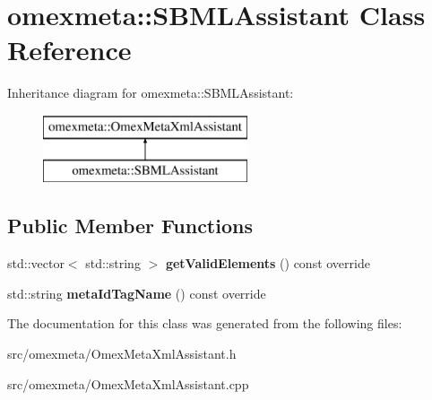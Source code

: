 \hypertarget{classomexmeta_1_1SBMLAssistant}{}\section{omexmeta\+:\+:S\+B\+M\+L\+Assistant Class Reference}
\label{classomexmeta_1_1SBMLAssistant}
Inheritance diagram for omexmeta\+:\+:S\+B\+M\+L\+Assistant\+:\begin{figure}[H]
\begin{center}
\leavevmode
\includegraphics[height=2.000000cm]{classomexmeta_1_1SBMLAssistant}
\end{center}
\end{figure}
\subsection*{Public Member Functions}
\begin{DoxyCompactItemize}
\item 
\mbox{\label{classomexmeta_1_1SBMLAssistant_afcc69d3e7a12673071632f757290d798}} 
std\+::vector$<$ std\+::string $>$ {\bfseries get\+Valid\+Elements} () const override
\item 
\mbox{\label{classomexmeta_1_1SBMLAssistant_ad3c3ab0ac3004961e5c2951568528d8a}} 
std\+::string {\bfseries meta\+Id\+Tag\+Name} () const override
\end{DoxyCompactItemize}


The documentation for this class was generated from the following files\+:\begin{DoxyCompactItemize}
\item 
src/omexmeta/Omex\+Meta\+Xml\+Assistant.\+h\item 
src/omexmeta/Omex\+Meta\+Xml\+Assistant.\+cpp\end{DoxyCompactItemize}
